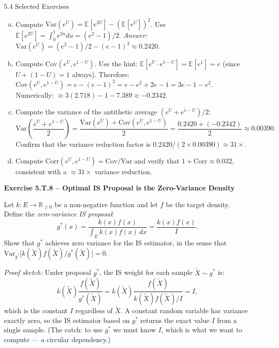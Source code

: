 \documentclass[aspectratio=169,10pt]{beamer}
\begin{document}
\begin{frame}[allowframebreaks]{5.4 Selected Exercises}
\begin{enumerate}[(a)]
  \item Compute $\mathrm{Var}(e^U) = \mathbb{E}[e^{2U}] - (\mathbb{E}[e^U])^2$.
        Use $\mathbb{E}[e^{2U}] = \int_0^1 e^{2u} du = (e^2 - 1)/2$.
        \emph{Answer:} $\mathrm{Var}(e^U) = (e^2-1)/2 - (e-1)^2 \approx 0.2420$.

  \item Compute $\mathrm{Cov}(e^U, e^{1-U})$.
        Use the hint: $\mathbb{E}[e^U \cdot e^{1-U}] = \mathbb{E}[e^1] = e$
        (since $U + (1-U) = 1$ always).  Therefore:
        $\mathrm{Cov}(e^U, e^{1-U}) = e - (e-1)^2 = e - e^2 + 2e - 1 = 3e - 1 - e^2$.
        Numerically: $\approx 3(2.718) - 1 - 7.389 \approx -0.2342$.

  \item Compute the variance of the antithetic average $(e^U + e^{1-U})/2$:
        \[
          \mathrm{Var}\!\left(\frac{e^U + e^{1-U}}{2}\right)
          = \frac{\mathrm{Var}(e^U) + \mathrm{Cov}(e^U, e^{1-U})}{2}
          = \frac{0.2420 + (-0.2342)}{2} \approx 0.00390.
        \]
        Confirm that the variance reduction factor is
        $0.2420 / (2 \times 0.00390) \approx 31\times$.

  \item Compute $\mathrm{Corr}(e^U, e^{1-U}) = \mathrm{Cov} / \mathrm{Var}$
        and verify that $1 + \mathrm{Corr} \approx 0.032$, consistent with a
        $\approx 31\times$ variance reduction.
\end{enumerate}

\framebreak

\textbf{Exercise 5.T.8 -- Optimal IS Proposal is the Zero-Variance Density}

Let $k : E \to \mathbb{R}_{\ge 0}$ be a non-negative function and let $f$ be
the target density.  Define the \emph{zero-variance IS proposal}:
\[
  g^*(x) = \frac{k(x)f(x)}{\int_E k(x)f(x)\,dx} = \frac{k(x)f(x)}{I}.
\]
Show that $g^*$ achieves zero variance for the IS estimator, in the sense that
$\mathrm{Var}_{g^*}\!\bigl[k(\tilde{X})f(\tilde{X})/g^*(\tilde{X})\bigr] = 0$.

\medskip
\emph{Proof sketch:}
Under proposal $g^*$, the IS weight for each sample $\tilde{X} \sim g^*$ is:
\[
  k(\tilde{X})\frac{f(\tilde{X})}{g^*(\tilde{X})} = k(\tilde{X})\frac{f(\tilde{X})}{k(\tilde{X})f(\tilde{X})/I} = I,
\]
which is the constant $I$ regardless of $\tilde{X}$.  A constant random variable
has variance exactly zero, so the IS estimator based on $g^*$ returns the exact
value $I$ from a single sample.  (The catch: to use $g^*$ we must know $I$,
which is what we want to compute --- a circular dependency.)


\end{frame}
\end{document}
